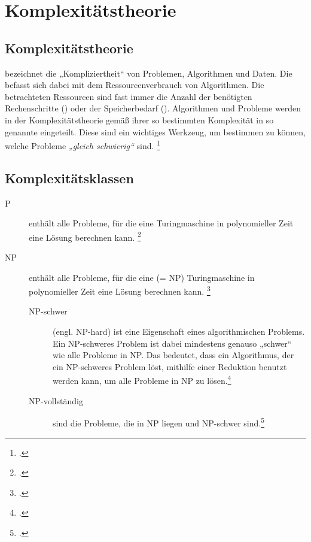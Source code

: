 \documentclass{lehramt-informatik-haupt}
\begin{document}

\chapter{Komplexitätstheorie}

%

\section{Komplexitätstheorie}

 bezeichnet die „Kompliziertheit“ von Problemen,
Algorithmen und Daten.
%
Die  befasst sich dabei mit dem
Ressourcenverbrauch von Algorithmen.
%
Die betrachteten Ressourcen sind fast immer die Anzahl der
benötigten Rechenschritte () oder der
Speicherbedarf ().
%
Algorithmen und Probleme werden in der Komplexitätstheorie gemäß ihrer
so bestimmten Komplexität in so genannte 
eingeteilt. Diese sind ein wichtiges Werkzeug, um bestimmen zu können,
welche Probleme \emph{„gleich schwierig“} sind.
\footcite[Seite 58]{theo:fs:4}

\section{Komplexitätsklassen}

\begin{description}
\item[P]
enthält alle Probleme, für die eine 
Turingmaschine in polynomieller Zeit eine Lösung berechnen kann.
\footcite[Seite 59]{theo:fs:4}

\item[NP]
enthält alle Probleme, für die eine  (= NP)
Turingmaschine in polynomieller Zeit eine Lösung berechnen kann.
\footcite[Seite 60]{theo:fs:4}

\begin{description}
\item[NP-schwer] (engl. NP-hard) ist eine Eigenschaft eines
algorithmischen Problems. Ein NP-schweres Problem ist dabei mindestens
genauso „schwer“ wie alle Probleme in NP. Das bedeutet, dass ein
Algorithmus, der ein NP-schweres Problem löst, mithilfe einer Reduktion
benutzt werden kann, um alle Probleme in NP zu lösen.\footcite{wiki:np-schwer}

\item[NP-vollständig] sind die Probleme, die in NP liegen
und NP-schwer sind.\footcite{wiki:np-vollstaendig}
\end{description}
\end{description}
\end{document}
